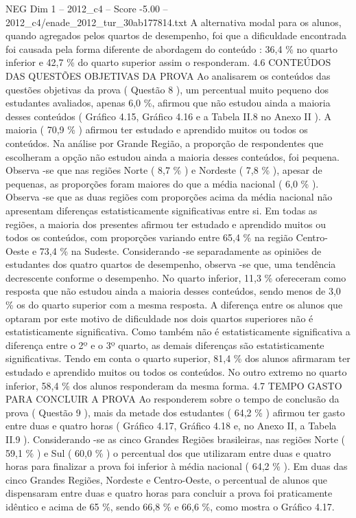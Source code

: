 \begin{textsample}{NEG Dim 1 – 2012\_c4 – Score -5.00 – 2012\_c4/enade\_2012\_tur\_30ab177814.txt}
A alternativa modal para os alunos, quando agregados pelos quartos de desempenho, foi que a dificuldade encontrada foi causada pela forma diferente de abordagem do conteúdo : 36,4 \% no quarto inferior e 42,7 \% do quarto superior assim o responderam. 4.6 CONTEÚDOS DAS QUESTÕES OBJETIVAS DA PROVA Ao analisarem os conteúdos das questões objetivas da prova ( Questão 8 ), um percentual muito pequeno dos estudantes avaliados, apenas 6,0 \%, afirmou que não estudou ainda a maioria desses conteúdos ( Gráfico 4.15, Gráfico 4.16 e a Tabela II.8 no Anexo II ).
A maioria ( 70,9 \% ) afirmou ter estudado e aprendido muitos ou todos os conteúdos.
Na análise por Grande Região, a proporção de respondentes que escolheram a opção não estudou ainda a maioria desses conteúdos, foi pequena.
Observa -se que nas regiões Norte ( 8,7 \% ) e Nordeste ( 7,8 \% ), apesar de pequenas, as proporções foram maiores do que a média nacional ( 6,0 \% ).
Observa -se que as duas regiões com proporções acima da média nacional não apresentam diferenças estatisticamente significativas entre si.
Em todas as regiões, a maioria dos presentes afirmou ter estudado e aprendido muitos ou todos os conteúdos, com proporções variando entre 65,4 \% na região Centro-Oeste e 73,4 \% na Sudeste.
Considerando -se separadamente as opiniões de estudantes dos quatro quartos de desempenho, observa -se que, uma tendência decrescente conforme o desempenho.
No quarto inferior, 11,3 \% ofereceram como resposta que não estudou ainda a maioria desses conteúdos, sendo menos de 3,0 \% os do quarto superior com a mesma resposta.
A diferença entre os alunos que optaram por este motivo de dificuldade nos dois quartos superiores não é estatisticamente significativa.
Como também não é estatisticamente significativa a diferença entre o 2º e o 3º quarto, as demais diferenças são estatisticamente significativas.
Tendo em conta o quarto superior, 81,4 \% dos alunos afirmaram ter estudado e aprendido muitos ou todos os conteúdos.
No outro extremo no quarto inferior, 58,4 \% dos alunos responderam da mesma forma. 4.7 TEMPO GASTO PARA CONCLUIR A PROVA Ao responderem sobre o tempo de conclusão da prova ( Questão 9 ), mais da metade dos estudantes ( 64,2 \% ) afirmou ter gasto entre duas e quatro horas ( Gráfico 4.17, Gráfico 4.18 e, no Anexo II, a Tabela II.9 ).
Considerando -se as cinco Grandes Regiões brasileiras, nas regiões Norte ( 59,1 \% ) e Sul ( 60,0 \% ) o percentual dos que utilizaram entre duas e quatro horas para finalizar a prova foi inferior à média nacional ( 64,2 \% ).
Em duas das cinco Grandes Regiões, Nordeste e Centro-Oeste, o percentual de alunos que dispensaram entre duas e quatro horas para concluir a prova foi praticamente idêntico e acima de 65 \%, sendo 66,8 \% e 66,6 \%, como mostra o Gráfico 4.17.

\end{textsample}

